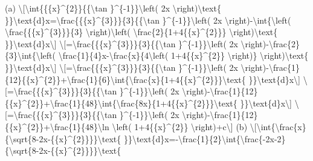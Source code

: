 \item (a) \textbackslash{[}\textbackslash int\{\{\{x\}\textasciicircum\{2\}\}\{\{\textbackslash tan
\}\textasciicircum\{-1\}\}\textbackslash left( 2x \textbackslash right)\textbackslash text\{
\}\}\textbackslash text\{d\}x=\textbackslash frac\{\{\{x\}\textasciicircum\{3\}\}\}\{3\}\{\{\textbackslash tan
\}\textasciicircum\{-1\}\}\textbackslash left( 2x \textbackslash right)-\textbackslash int\{\textbackslash left(
\textbackslash frac\{\{\{x\}\textasciicircum\{3\}\}\}\{3\} \textbackslash right)\textbackslash left(
\textbackslash frac\{2\}\{1+4\{\{x\}\textasciicircum\{2\}\}\} \textbackslash right)\textbackslash text\{
\}\}\textbackslash text\{d\}x\textbackslash{]} \textbackslash{[}=\textbackslash frac\{\{\{x\}\textasciicircum\{3\}\}\}\{3\}\{\{\textbackslash tan
\}\textasciicircum\{-1\}\}\textbackslash left( 2x \textbackslash right)-\textbackslash frac\{2\}\{3\}\textbackslash int\{\textbackslash left(
\textbackslash frac\{1\}\{4\}x-\textbackslash frac\{x\}\{4\textbackslash left(
1+4\{\{x\}\textasciicircum\{2\}\} \textbackslash right)\} \textbackslash right)\textbackslash text\{
\}\}\textbackslash text\{d\}x\textbackslash{]} \textbackslash{[}=\textbackslash frac\{\{\{x\}\textasciicircum\{3\}\}\}\{3\}\{\{\textbackslash tan
\}\textasciicircum\{-1\}\}\textbackslash left( 2x \textbackslash right)-\textbackslash frac\{1\}\{12\}\{\{x\}\textasciicircum\{2\}\}+\textbackslash frac\{1\}\{6\}\textbackslash int\{\textbackslash frac\{x\}\{1+4\{\{x\}\textasciicircum\{2\}\}\}\textbackslash text\{
\}\}\textbackslash text\{d\}x\textbackslash{]} \textbackslash{[}=\textbackslash frac\{\{\{x\}\textasciicircum\{3\}\}\}\{3\}\{\{\textbackslash tan
\}\textasciicircum\{-1\}\}\textbackslash left( 2x \textbackslash right)-\textbackslash frac\{1\}\{12\}\{\{x\}\textasciicircum\{2\}\}+\textbackslash frac\{1\}\{48\}\textbackslash int\{\textbackslash frac\{8x\}\{1+4\{\{x\}\textasciicircum\{2\}\}\}\textbackslash text\{
\}\}\textbackslash text\{d\}x\textbackslash{]} \textbackslash{[}=\textbackslash frac\{\{\{x\}\textasciicircum\{3\}\}\}\{3\}\{\{\textbackslash tan
\}\textasciicircum\{-1\}\}\textbackslash left( 2x \textbackslash right)-\textbackslash frac\{1\}\{12\}\{\{x\}\textasciicircum\{2\}\}+\textbackslash frac\{1\}\{48\}\textbackslash ln
\textbackslash left( 1+4\{\{x\}\textasciicircum\{2\}\} \textbackslash right)+c\textbackslash{]}
(b) \textbackslash{[}\textbackslash int\{\textbackslash frac\{x\}\{\textbackslash sqrt\{8-2x-\{\{x\}\textasciicircum\{2\}\}\}\}\textbackslash text\{
\}\}\textbackslash text\{d\}x=-\textbackslash frac\{1\}\{2\}\textbackslash int\{\textbackslash frac\{-2x-2\}\{\textbackslash sqrt\{8-2x-\{\{x\}\textasciicircum\{2\}\}\}\}\textbackslash text\{
